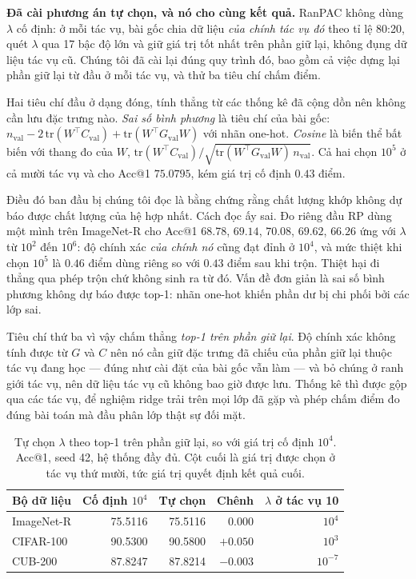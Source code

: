 \documentclass[11pt,a4paper]{article}
\begin{document}
\textbf{Đã cài phương án tự chọn, và nó cho cùng kết quả.} RanPAC không dùng
$\lambda$ cố định: ở mỗi tác vụ, bài gốc chia dữ liệu \emph{của chính tác vụ đó}
theo tỉ lệ 80:20, quét $\lambda$ qua 17 bậc độ lớn và giữ giá trị tốt nhất trên
phần giữ lại, không đụng dữ liệu tác vụ cũ. Chúng tôi đã cài lại đúng quy trình
đó, bao gồm cả việc dựng lại phần giữ lại từ đầu ở mỗi tác vụ, và thử ba tiêu chí
chấm điểm.

Hai tiêu chí đầu ở dạng đóng, tính thẳng từ các thống kê đã cộng dồn nên không
cần lưu đặc trưng nào. \emph{Sai số bình phương} là tiêu chí của bài gốc:
$n_{\mathrm{val}} - 2\,\mathrm{tr}(W^{\top} C_{\mathrm{val}})
+ \mathrm{tr}(W^{\top} G_{\mathrm{val}} W)$ với nhãn one-hot. \emph{Cosine} là
biến thể bất biến với thang đo của $W$,
$\mathrm{tr}(W^{\top} C_{\mathrm{val}}) /
\sqrt{\mathrm{tr}(W^{\top} G_{\mathrm{val}} W)\, n_{\mathrm{val}}}$. Cả hai chọn
$10^5$ ở cả mười tác vụ và cho Acc@1 $75.0795$, kém giá trị cố định $0.43$ điểm.

Điều đó ban đầu bị chúng tôi đọc là bằng chứng rằng chất lượng khớp không dự báo
được chất lượng của hệ hợp nhất. Cách đọc ấy sai. Đo riêng đầu RP dùng một mình
trên ImageNet-R cho Acc@1 $68.78$, $69.14$, $70.08$, $69.62$, $66.26$ ứng với
$\lambda$ từ $10^2$ đến $10^6$: độ chính xác \emph{của chính nó} cũng đạt đỉnh ở
$10^4$, và mức thiệt khi chọn $10^5$ là $0.46$ điểm dùng riêng so với $0.43$ điểm
sau khi trộn. Thiệt hại đi thẳng qua phép trộn chứ không sinh ra từ đó. Vấn đề
đơn giản là sai số bình phương không dự báo được top-1: nhãn one-hot khiến phần
dư bị chi phối bởi các lớp sai.

Tiêu chí thứ ba vì vậy chấm thẳng \emph{top-1 trên phần giữ lại}. Độ chính xác
không tính được từ $G$ và $C$ nên nó cần giữ đặc trưng đã chiếu của phần giữ lại
thuộc tác vụ đang học --- đúng như cài đặt của bài gốc vẫn làm --- và bỏ chúng ở
ranh giới tác vụ, nên dữ liệu tác vụ cũ không bao giờ được lưu. Thống kê thì được
gộp qua các tác vụ, để nghiệm ridge trải trên mọi lớp đã gặp và phép chấm điểm đo
đúng bài toán mà đầu phân lớp thật sự đối mặt.

\begin{table}[htbp]
\centering
\caption{Tự chọn $\lambda$ theo top-1 trên phần giữ lại, so với giá trị cố định
$10^4$. Acc@1, seed 42, hệ thống đầy đủ. Cột cuối là giá trị được chọn ở tác vụ
thứ mười, tức giá trị quyết định kết quả cuối.}
\label{tab:lambda-auto}
\begin{tabular}{@{}lrrrr@{}}
\toprule
Bộ dữ liệu & Cố định $10^4$ & Tự chọn & Chênh & $\lambda$ ở tác vụ 10 \\
\midrule
ImageNet-R & 75.5116 & 75.5116 & $0.000$  & $10^4$ \\
CIFAR-100  & 90.5300 & 90.5800 & $+0.050$ & $10^3$ \\
CUB-200    & 87.8247 & 87.8214 & $-0.003$ & $10^{-7}$ \\
\bottomrule
\end{tabular}
\end{table}
\end{document}
